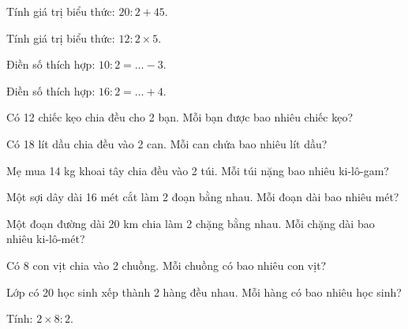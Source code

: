 \begin{ex}
Tính giá trị biểu thức: $20 : 2 + 45$.
\end{ex}

\begin{ex}
Tính giá trị biểu thức: $12 : 2 \times 5$.
\end{ex}

\begin{ex}
Điền số thích hợp: $10 : 2 = \dots - 3$.
\end{ex}

\begin{ex}
Điền số thích hợp: $16 : 2 = \dots + 4$.
\end{ex}

\begin{ex}
Có 12 chiếc kẹo chia đều cho 2 bạn. Mỗi bạn được bao nhiêu chiếc kẹo?
\end{ex}

\begin{ex}
Có 18 lít dầu chia đều vào 2 can. Mỗi can chứa bao nhiêu lít dầu?
\end{ex}

\begin{ex}
Mẹ mua 14 kg khoai tây chia đều vào 2 túi. Mỗi túi nặng bao nhiêu ki-lô-gam?
\end{ex}

\begin{ex}
Một sợi dây dài 16 mét cắt làm 2 đoạn bằng nhau. Mỗi đoạn dài bao nhiêu mét?
\end{ex}

\begin{ex}
Một đoạn đường dài 20 km chia làm 2 chặng bằng nhau. Mỗi chặng dài bao nhiêu ki-lô-mét?
\end{ex}

\begin{ex}
Có 8 con vịt chia vào 2 chuồng. Mỗi chuồng có bao nhiêu con vịt?
\end{ex}

\begin{ex}
Lớp có 20 học sinh xếp thành 2 hàng đều nhau. Mỗi hàng có bao nhiêu học sinh?
\end{ex}

\begin{ex}
Tính: $2 \times 8 : 2$.
\end{ex}

